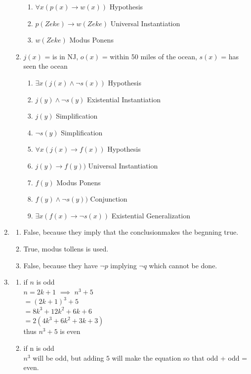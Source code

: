 \documentclass{article}
\begin{document}
\begin{enumerate}
\begin{enumerate}
\begin{enumerate}
  \item $\forall x(p(x) \rightarrow w(x))$ \quad Hypothesis
  \item $p(Zeke) \rightarrow w(Zeke)$ \quad Universal Instantiation
  \item $w(Zeke)$ \quad Modus Ponens
  \end{enumerate}
 \item $j(x)$ = is in NJ, $o(x)$ = within 50 miles of the ocean, $s(x)$ = has seen the ocean
  \begin{enumerate}
  \item $\exists x(j(x) \land \neg s(x))$ \quad Hypothesis
  \item $j(y) \land \neg s(y)$ \quad Existential Instantiation
  \item $j(y)$ \quad Simplification
  \item $\neg s(y)$ \quad Simplification
  \item $\forall x(j(x) \rightarrow f(x))$ \quad Hypothesis
  \item $j(y) \rightarrow f(y))$ \quad Universal Instantiation
  \item $f(y)$ \quad Modus Ponens
  \item $f(y) \land \neg s(y))$ \quad Conjunction
  \item $\exists x(f(x) \rightarrow \neg s(x))$ \quad Existential Generalization
  \end{enumerate}
 \end{enumerate}

\item 
 \begin{enumerate}
 \item False, because they imply that the conclusionmakes the begnning true.
 \item True, modus tollens is used.
 \item False, because they have $\neg p$ implying $\neg q$ which cannot be done.
 \end{enumerate}

\item 
 \begin{enumerate}
 \item if $n$ is odd \\
  $n=2k+1$ $\implies$ $n^3+5$ \\
  $= (2k+1)^3+5$ \\
  $= 8k^3+12k^2+6k+6$ \\
  $= 2(4k^3+6k^2+3k+3)$ \\
  thus $n^3+5$ is even
 \item if n is odd \\
  $n^3$ will be odd, but adding $5$ will make the equation so that odd + odd = even.
 \end{enumerate}


\end{enumerate}
\end{document}

